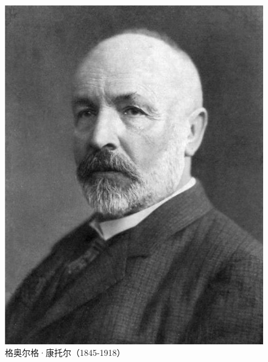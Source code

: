 \documentclass[b5paper]{ctexart}
\begin{document}
\begin{figure}[htbp]
 \centering
 \includegraphics[scale=0.5]{img/Cantor}
 \caption{格奥尔格·康托尔（1845-1918）}
 \label{fig:Cantor}
\end{figure}
\end{document}
